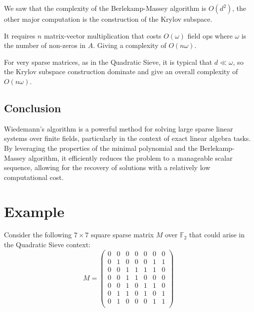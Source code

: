 \documentclass[a4paper, 11pt]{article}
\begin{document}
We saw that the complexity of the Berlekamp-Massey algorithm is $O(d^2)$, the other major computation is the construction of the Krylov subspace.

It requires $n$ matrix-vector multiplication that costs $O(\omega)$ field ops where $\omega$ is the number of non-zeros in $A$. Giving a complexity of $O(n\omega)$.

For very sparse matrices, as in the Quadratic Sieve, it is typical that $d \ll \omega$, so the Krylov subspace construction dominate and give an overall complexity of $O(n\omega)$.

\subsection{Conclusion}
Wiedemann's algorithm is a powerful method for solving large sparse linear systems over finite fields, particularly in the context of exact linear algebra tasks. By leveraging the properties of the minimal polynomial and the Berlekamp-Massey algorithm, it efficiently reduces the problem to a manageable scalar sequence, allowing for the recovery of solutions with a relatively low computational cost.

\section{Example}

Consider the following $7 \times 7$ square sparse matrix $M$ over $\mathbb{F}_2$ that could arise in the Quadratic Sieve context:
\begin{equation}
    M = \begin{pmatrix}
        0 & 0 & 0 & 0 & 0 & 0 & 0 \\
        0 & 1 & 0 & 0 & 0 & 1 & 1 \\
        0 & 0 & 1 & 1 & 1 & 1 & 0 \\
        0 & 0 & 1 & 1 & 0 & 0 & 0 \\
        0 & 0 & 1 & 0 & 1 & 1 & 0 \\
        0 & 1 & 1 & 0 & 1 & 0 & 1 \\
        0 & 1 & 0 & 0 & 0 & 1 & 1 \\
    \end{pmatrix}
\end{equation}
\end{document}
